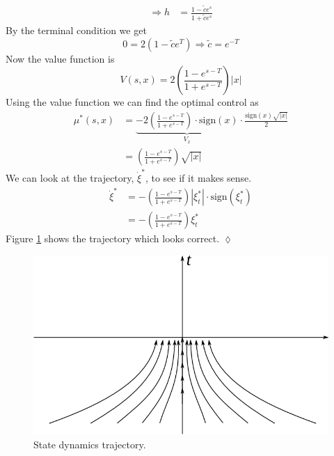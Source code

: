 \begin{example}
\begin{align*}
\Rightarrow h &= \frac{1-\tilde{c}e^s}{1+\tilde{c}e^s}
\end{align*}
By the terminal condition we get
$$0 = 2(1-\tilde{c}e^T) \Rightarrow \tilde{c} = e^{-T}$$
Now the value function is
$$V(s,x) = 2\left(\frac{1-e^{s-T}}{1+e^{s-T}}\right)|x|$$
Using the value function we can find the optimal control as
\begin{align*}
\mu^\ast(s,x) &= \underbrace{-2\left(\frac{1-e^{s-T}}{1+e^{s-T}}\right)\cdot\text{sign}(x)}_{V_x}\cdot\frac{\text{sign}(x)\sqrt{|x|}}{2} \\
&= \left(\frac{1-e^{s-T}}{1+e^{s-T}}\right)\sqrt{|x|}
\end{align*}
We can look at the trajectory, $\dot{\xi}^\ast$, to see if it makes sense.
\begin{align*}
\dot{\xi}^\ast &= -\left(\frac{1-e^{s-T}}{1+e^{s-T}}\right)|\xi_t^\ast|\cdot\text{sign}(\xi_t^\ast) \\
&= -\left(\frac{1-e^{s-T}}{1+e^{s-T}}\right)\xi_t^\ast
\end{align*}
Figure \ref{fig:13trajectory} shows the trajectory which looks correct.
$\lozenge$
\end{example}

\begin{figure}[ht!]
	\centering
	\includegraphics[width=.6\textwidth]{images/13trajectory}
	\caption{State dynamics trajectory.}
	\label{fig:13trajectory}
\end{figure}

